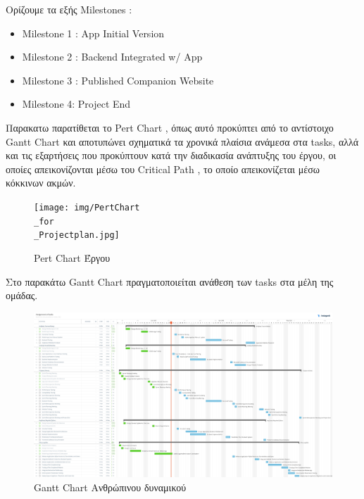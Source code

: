 \documentclass{../ol-softwaremanual}
\begin{document}
	\vspace{20pt}
	Ορίζουμε τα εξής \en Milestones \gr :
	
	\begin{itemize}
		\item \en Milestone 1 : App Initial Version
		\item \en Milestone 2 : Backend Integrated w/ App
		\item \en Milestone 3 : Published Companion Website
		\item \en Milestone 4: Project End
	\end{itemize}
	
	
	\newpage 
	
	\flushleft
	Παρακατω παρατίθεται το \en Pert Chart \gr, όπως αυτό προκύπτει από το αντίστοιχο \en Gantt Chart \gr και αποτυπώνει σχηματικά τα χρονικά πλαίσια ανάμεσα στα \en tasks\gr, αλλά και τις εξαρτήσεις που προκύπτουν κατά την διαδικασία ανάπτυξης του έργου, οι οποίες απεικονίζονται μέσω του \en Critical Path \gr, το οποίο απεικονίζεται μέσω κόκκινων ακμών.
	
	
	\begin{figure}[htbp!]
		
		\texttt{[image: img/PertChart\\\_for\\\_Projectplan.jpg]}
		\caption{ \en Pert Chart \gr Έργου}
	\end{figure}
	
	\newpage
	
	\vspace{20pt}
	\flushleft
	Στο παρακάτω \en Gantt Chart \gr πραγματοποιείται ανάθεση των \en tasks \gr στα μέλη της ομάδας.
	
	\begin{figure}[htbp!]
		
		\includegraphics[width=\textwidth, height=\textheight, keepaspectratio ]{img/Ανάθεση_εργασιών.jpg}
		\caption{ \en Gantt Chart \gr Ανθρώπινου δυναμικού}
	\end{figure}
	
\end{document}
